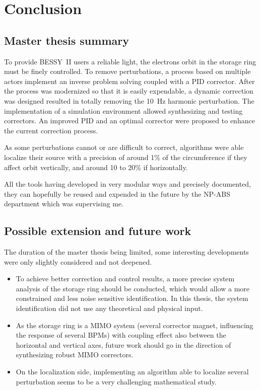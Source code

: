 
\chapter{Conclusion}
\label{sec:conclusion}
\section{Master thesis summary}
To provide BESSY~II users a reliable light, the electrons orbit in the storage ring must be finely controlled. To remove perturbations, a process based on multiple actors implement an inverse problem solving coupled with a PID corrector. After the process was modernized so that it is easily expendable, a dynamic correction was designed resulted in totally removing the \SI{10}{\hertz} harmonic perturbation. The implementation of a simulation environment allowed synthesizing and testing correctors. An improved PID and an optimal corrector were proposed to enhance the current correction process.

As some perturbations cannot or are difficult to correct, algorithms were able localize their source with a precision of around 1\% of the circumference if they affect orbit vertically, and around 10 to 20\% if horizontally.

All the tools having developed in very modular ways and precisely documented, they can hopefully be reused and expended in the future by the NP-ABS department which was supervising me.

\section{Possible extension and future work}

The duration of the master thesis being limited, some interesting developments were only slightly considered and not deepened.

\begin{itemize}
    \item To achieve better correction and control results, a more precise system analysis of the storage ring should be conducted, which would allow a more constrained and less noise sensitive identification.  In this thesis, the system identification did not use any theoretical and physical input.
    \item As the storage ring is a MIMO system (several corrector magnet, influencing the response of several BPMs) with coupling effect also between the horizontal and vertical axes, future work should go in the direction of synthesizing robust MIMO correctors.
    \item On the localization side, implementing an algorithm able to localize several perturbation seems to be a very challenging mathematical study.
\end{itemize}